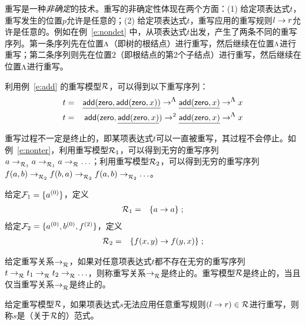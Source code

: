 重写是一种\emph{非确定}的技术。重写的非确定性体现在两个方面：(1) 给定项表达式$t$，重写发生的位置$p$允许是任意的；(2) 给定项表达式$t$，重写应用的重写规则$l \ra r$允许是任意的。例如在例~\ref{e:nondet} 中，从项表达式$t$出发，产生了两条不同的重写序列。第一条序列先在位置$\rootp$（即树的根结点）进行重写，然后继续在位置$\rootp$进行重写；第二条序列则先在位置$2$（即根结点的第2个子结点）进行重写，然后继续在位置$\rootp$进行重写。

\begin{example}
\label{e:nondet}
利用例~\ref{e:add} 的重写模型$\cR$，可以得到以下重写序列：
\begin{eqnarray}
t & = & \underline{\add(\zero,\add(\zero,x))} \lrps{\rootp}{} 
\underline{\add(\zero,x)} \lrps{\rootp}{} x \nonumber \\
t & = & \add(\zero,\underline{\add(\zero,x)}) \lrps{2}{} 
\underline{\add(\zero,x)} \lrps{\rootp}{} x \nonumber 
\end{eqnarray}
\end{example}

重写过程不一定是终止的，即某项表达式$t$可以一直被重写，其过程不会停止。如例~\ref{e:nonter}，利用重写模型$\cR_1$，可以得到无穷的重写序列$a\lrps{}{\cR_1}a\lrps{}{\cR_1} a \lrps{}{\cR} \ldots$；利用重写模型$\cR_2$，可以得到无穷的重写序列$f(a,b) \lrps{}{\cR_2} f(b,a) \lrps{}{\cR_2} f(a,b) \lrps{}{\cR_2} \ldots$。

\begin{example}
\label{e:nonter}
给定$\cF_1=\{a^{(0)}\}$，定义
\begin{eqnarray}
\cR_1 & = & \{a \ra a\} \; ; \nonumber
\end{eqnarray}
给定$\cF_2=\{a^{(0)},b^{(0)},f^{(2)}\}$，定义
\begin{eqnarray}
\cR_2 & = & \{f(x,y) \ra f(y,x)\} \; ; \nonumber
\end{eqnarray}
\end{example}

\begin{definition}[终止性]
\label{d:termination}
给定重写关系$\lrps{}{\cR}$，如果对任意项表达式$t$都不存在无穷的重写序列$t\lrps{}{\cR} t_1 \lrps{}{\cR} t_2 \lrps{}{\cR} \ldots$，则称重写关系$\lrps{}{\cR}$是终止的。重写模型$\cR$是终止的，当且仅当重写关系$\lrps{}{\cR}$是终止的。
\end{definition}

\begin{definition}[范式]
\label{d:normalform}
给定重写模型$\cR$，如果项表达式$s$无法应用任意重写规则$(l \ra r)\in \cR$进行重写，则称$s$是（关于$\cR$的）范式。
\end{definition}

